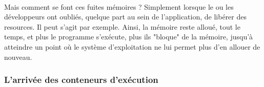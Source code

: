 {  \paragraph{} Mais comment se font ces fuites mémoires ? Simplement lorsque le ou les développeurs
  ont oubliés, quelque part au sein de l'application, de libérer des resources. Il peut s'agit par
  exemple. Ainsi, la mémoire reste alloué, tout le temps, et plus le programme s'exécute, plus ils
  "bloque" de la mémoire, jusqu'à atteindre un point où le système d'exploitation ne lui permet plus
  d'en allouer de nouveau.

}

\subsubsection{L'arrivée des conteneurs d'exécution}

